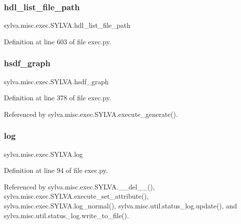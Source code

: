 \subsubsection{\texorpdfstring{hdl\+\_\+list\+\_\+file\+\_\+path}{hdl\_list\_file\_path}}
{\footnotesize\ttfamily sylva.\+misc.\+exec.\+S\+Y\+L\+V\+A.\+hdl\+\_\+list\+\_\+file\+\_\+path}



Definition at line 603 of file exec.\+py.

\mbox{\label{classsylva_1_1misc_1_1exec_1_1_s_y_l_v_a_a28c35ccef899db163e488742450c669f}} 
\subsubsection{\texorpdfstring{hsdf\+\_\+graph}{hsdf\_graph}}
{\footnotesize\ttfamily sylva.\+misc.\+exec.\+S\+Y\+L\+V\+A.\+hsdf\+\_\+graph}



Definition at line 378 of file exec.\+py.



Referenced by sylva.\+misc.\+exec.\+S\+Y\+L\+V\+A.\+execute\+\_\+generate().

\mbox{\label{classsylva_1_1misc_1_1exec_1_1_s_y_l_v_a_af18d1d94d1cd253fdd82470d0fd2d8b9}} 
\subsubsection{\texorpdfstring{log}{log}}
{\footnotesize\ttfamily sylva.\+misc.\+exec.\+S\+Y\+L\+V\+A.\+log}



Definition at line 94 of file exec.\+py.



Referenced by sylva.\+misc.\+exec.\+S\+Y\+L\+V\+A.\+\_\+\+\_\+del\+\_\+\+\_\+(), sylva.\+misc.\+exec.\+S\+Y\+L\+V\+A.\+execute\+\_\+set\+\_\+attribute(), sylva.\+misc.\+exec.\+S\+Y\+L\+V\+A.\+log\+\_\+normal(), sylva.\+misc.\+util.\+status\+\_\+log.\+update(), and sylva.\+misc.\+util.\+status\+\_\+log.\+write\+\_\+to\+\_\+file().

